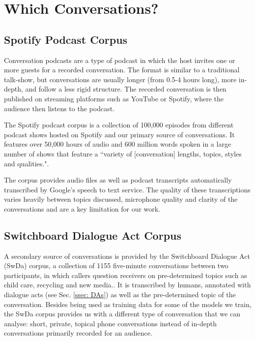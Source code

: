 \section{Which Conversations?}
    \subsection{Spotify Podcast Corpus \label{ssec: spotify corpus}}
        Conversation podcasts are a type of podcast in which the host invites one or more guests for a recorded conversation. The format is similar to a traditional talk-show, but conversations are usually longer (from 0.5-4 hours long), more in-depth, and follow a less rigid structure.  The recorded conversation is then published on streaming platforms such as YouTube or Spotify, where the audience then listens to the podcast.
        
        The Spotify podcast corpus\cite{clifton-2020100000} is a collection of 100,000 episodes from different podcast shows hosted on Spotify and our primary source of conversations. It features over 50,000 hours of audio and 600 million words spoken in a large number of shows that feature a ``variety of [conversation] lengths, topics, styles and qualities."\cite{clifton-2020100000}.
        
        The corpus provides audio files as well as podcast transcripts automatically transcribed by Google's speech to text service.\cite{clifton-2020100000} The quality of these transcriptions varies heavily between topics discussed, microphone quality and clarity of the conversations and are a key limitation for our work.
        
    \subsection{Switchboard Dialogue Act Corpus \label{ssec: swda}}
        A secondary source of conversations is provided by the Switchboard Dialogue Act (SwDa) corpus, a collection of 1155 five-minute conversations between two participants, in which callers question receivers on pre-determined topics such as child care, recycling and new media.\cite{fang2012annotation}. It is transcribed by humans, annotated with dialogue acts (see Sec. \ref{ssec: DAs}) as well as the pre-determined topic of the conversation. Besides being used as training data for some of the models we train, the SwDa corpus provides us with a different type of conversation that we can analyse: short, private, topical phone conversations instead of in-depth conversations primarily recorded for an audience.